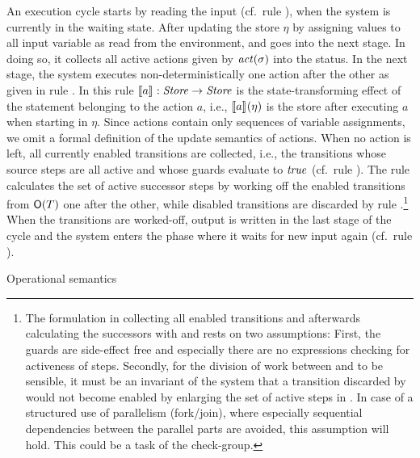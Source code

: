 An execution cycle starts by reading the input (cf.\ rule ), when
the system is currently in the waiting state. After updating the store
$\eta$ by assigning values to all input variable as read from the
environment, and goes into the next stage. In doing so, it collects all
active actions given by $\mathit{act}(\sigma)$ into the status.  In the next stage,
the system executes non-deterministically one action after the other as
given in rule .  In this rule $[\![a]\!]_{} \mathrel{:} \mathit{Store} \to \mathit{Store}$ is
the state-transforming effect of the statement belonging to the action $a$,
i.e., $[\![a]\!]_{}(\eta)$ is the store after executing $a$ when starting in
$\eta$.  Since actions contain only sequences of variable assignments, we
omit a formal definition of the update semantics of actions. When no action
is left, all currently enabled transitions are collected, i.e., the
transitions whose source steps are all active and whose guards evaluate to
$\mathit{true}$ (cf.\ rule ). The rule  calculates the set of
active successor steps by working off the enabled transitions from
$\mathsf{O}(T)$ one after the other, while disabled transitions are
discarded by rule .\footnote{The formulation in 
  collecting all enabled transitions and afterwards calculating the
  successors with  and  rests on two assumptions:
  First, the guards are side-effect free and especially there are no
  expressions checking for activeness of steps. Secondly, for the division
  of work between  and  to be sensible, it must be
  an invariant of the system that a transition discarded by 
  would not become enabled by enlarging the set of active steps in
  . In case of a structured use of parallelism (fork/join), where
  especially sequential dependencies between the parallel parts are
  avoided, this assumption will hold. This could be a task of the
  check-group.} When the transitions are worked-off, output is written in
the last stage of the cycle and the system enters the phase where it waits
for new input again (cf.\ rule ).


\begin{table}[htbp]
  \begin{ruleset}
      
  \end{ruleset}
  \caption{Operational semantics}
  \label{tab:operationalsemantics}
\end{table}

\fi%






